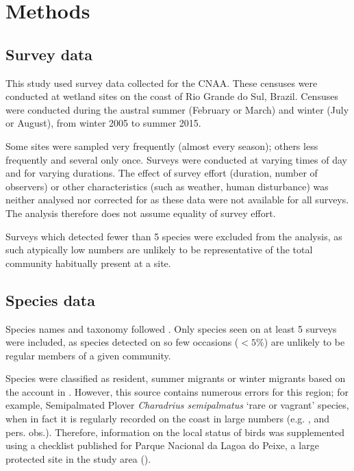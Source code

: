 \documentclass[12pt,a4paper,draft]{book}
\begin{document}
\newpage
\section{Methods}

\subsection{Survey data}

This study used survey data collected for the CNAA. These censuses were conducted at wetland sites on the coast of Rio Grande do Sul, Brazil. Censuses were conducted during the austral summer (February or March) and winter (July or August), from winter 2005 to summer 2015. 

Some sites were sampled very frequently (almost every season); others less frequently and several only once. Surveys were conducted at varying times of day and for varying durations. The effect of survey effort (duration, number of observers) or other characteristics (such as weather, human disturbance) was neither analysed nor corrected for as these data were not available for all surveys. The analysis therefore does not assume equality of survey effort. 

Surveys which detected fewer than 5 species were excluded from the analysis, as such atypically low numbers are unlikely to be representative of the total community habitually present at a site. 

\subsection{Species data}

Species names and taxonomy followed \cite{vanPerlo2009}. Only species seen on at least 5 surveys were included, as species detected on so few occasions ($<5\%$) are unlikely to be regular members of a given community. 

Species were classified as resident, summer migrants or winter migrants based on the account in \cite{vanPerlo2009}. However, this source contains numerous errors for this region; for example, Semipalmated Plover \textit{Charadrius semipalmatus} `rare or vagrant' species, when in fact it is regularly recorded on the coast in large numbers (e.g. \cite{Sanabria2011}, \cite{Scherer2012} and pers. obs.). Therefore, information on the local status of birds was supplemented using a checklist published for Parque Nacional da Lagoa do Peixe, a large protected site in the study area (\cite{Nascimento1995}).
\end{document}
